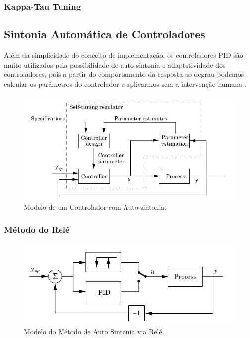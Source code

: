 \subsubsection{Kappa-Tau Tuning}

\subsection{Sintonia Automática de Controladores}

Além da simplicidade do conceito de implementação, os controladores PID são muito utilizados pela possibilidade de auto sintonia e adaptatividade dos controladores, pois a partir do comportamento da resposta ao degrau podemos calcular os parâmetros do controlador e aplicarmos sem a intervenção humana \cite{Astrom1995}.

\begin{figure}[h!]
  \caption{Modelo de um Controlador com Auto-sintonia.}
  \begin{center}
      \includegraphics[scale=0.75]{img/pid_adaptative_astrom_p233}
  \end{center}
  \label{fig:pid_adaptative_astrom_p233}
\end{figure}


\subsubsection{Método do Relé}

\begin{figure}[h!]
  \caption{Modelo do Método de Auto Sintonia via Relé.}
  \begin{center}
      \includegraphics[scale=0.75]{img/pid_autotuning_relay_astrom_p239}
  \end{center}
  \label{fig:pid_autotuning_relay_astrom_p239}
\end{figure}

